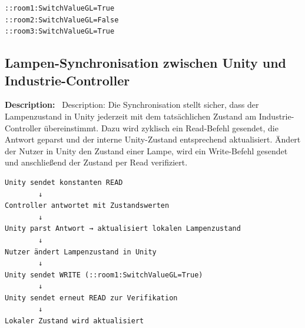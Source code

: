 \documentclass[]{article}
\begin{document}
\begin{verbatim}
::room1:SwitchValueGL=True
::room2:SwitchValueGL=False
::room3:SwitchValueGL=True
\end{verbatim}
\break
\subsection{Lampen-Synchronisation zwischen Unity und Industrie-Controller}
\textbf{Description:} \
Description:
Die Synchronisation stellt sicher, dass der Lampenzustand in Unity jederzeit mit dem tatsächlichen Zustand am Industrie-Controller übereinstimmt. Dazu wird zyklisch ein Read-Befehl gesendet, die Antwort geparst und der interne Unity-Zustand entsprechend aktualisiert. Ändert der Nutzer in Unity den Zustand einer Lampe, wird ein Write-Befehl gesendet und anschließend der Zustand per Read verifiziert.

\begin{verbatim}
Unity sendet konstanten READ
        ↓
Controller antwortet mit Zustandswerten
        ↓
Unity parst Antwort → aktualisiert lokalen Lampenzustand
        ↓
Nutzer ändert Lampenzustand in Unity
        ↓
Unity sendet WRITE (::room1:SwitchValueGL=True)
        ↓
Unity sendet erneut READ zur Verifikation
        ↓
Lokaler Zustand wird aktualisiert
\end{verbatim}
\end{document}
